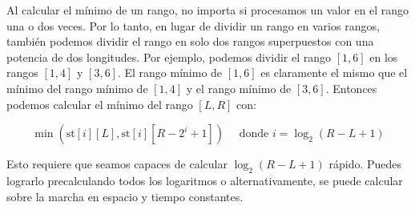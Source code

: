 Al calcular el mínimo de un rango, no importa si procesamos un valor en el rango una o dos veces. Por lo tanto, en lugar de dividir un rango en varios rangos, también podemos dividir el rango en solo dos rangos superpuestos con una
potencia de dos longitudes. Por ejemplo, podemos dividir el rango $[1, 6]$ en los rangos $[1, 4]$ y $[3, 6]$. El rango mínimo de $[1, 6]$ es claramente el mismo que el mínimo del rango mínimo de $[1, 4]$ y el rango mínimo de $[3, 6]$. 
Entonces podemos calcular el mínimo del rango $[L, R]$ con:

$$\min(\text{st}[i][L], \text{st}[i][R - 2^i + 1]) \quad \text{ donde } i = \log_2(R - L + 1)$$

Esto requiere que seamos capaces de calcular $\log_2(R - L + 1)$ rápido. Puedes lograrlo precalculando todos los logaritmos o alternativamente, se puede calcular sobre la marcha en espacio y tiempo constantes.